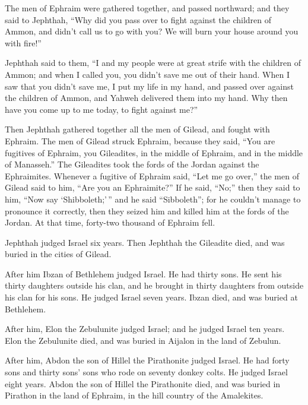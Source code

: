  The men of Ephraim were gathered together, and passed
northward; and they said to Jephthah, ``Why did you pass over to fight
against the children of Ammon, and didn't call us to go with you? We
will burn your house around you with fire!''

 Jephthah said to them, ``I and my people were at great
strife with the children of Ammon; and when I called you, you didn't
save me out of their hand.  When I saw that you didn't
save me, I put my life in my hand, and passed over against the children
of Ammon, and Yahweh delivered them into my hand. Why then have you come
up to me today, to fight against me?''

 Then Jephthah gathered together all the men of Gilead,
and fought with Ephraim. The men of Gilead struck Ephraim, because they
said, ``You are fugitives of Ephraim, you Gileadites, in the middle of
Ephraim, and in the middle of Manasseh.''  The Gileadites
took the fords of the Jordan against the Ephraimites. Whenever a
fugitive of Ephraim said, ``Let me go over,'' the men of Gilead said to
him, ``Are you an Ephraimite?'' If he said, ``No;''  then
they said to him, ``Now say `Shibboleth;'\,'' and he said ``Sibboleth'';
for he couldn't manage to pronounce it correctly, then they seized him
and killed him at the fords of the Jordan. At that time, forty-two
thousand of Ephraim fell.

 Jephthah judged Israel six years. Then Jephthah the
Gileadite died, and was buried in the cities of Gilead.

 After him Ibzan of Bethlehem judged Israel.
 He had thirty sons. He sent his thirty daughters outside
his clan, and he brought in thirty daughters from outside his clan for
his sons. He judged Israel seven years.  Ibzan died, and
was buried at Bethlehem.

 After him, Elon the Zebulunite judged Israel; and he
judged Israel ten years.  Elon the Zebulunite died, and
was buried in Aijalon in the land of Zebulun.

 After him, Abdon the son of Hillel the Pirathonite
judged Israel.  He had forty sons and thirty sons' sons
who rode on seventy donkey colts. He judged Israel eight years.
 Abdon the son of Hillel the Pirathonite died, and was
buried in Pirathon in the land of Ephraim, in the hill country of the
Amalekites.


